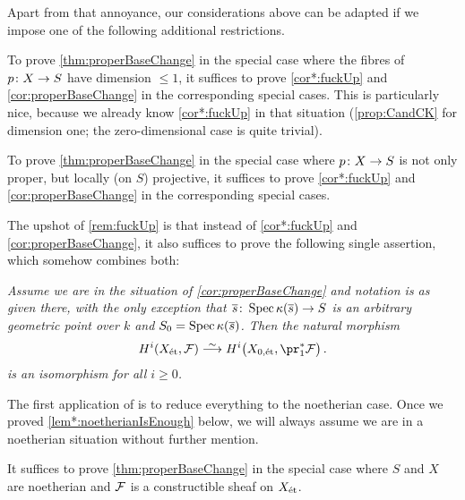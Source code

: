 \documentclass[a4paper, 10pt, oneside, DIV=9, chapterprefix=true, numbers=enddot, bibliography=totoc]{scrbook}
\begin{document}
\begin{rem}
Apart from that annoyance, our considerations above can be adapted if we impose one of the following additional restrictions.
\begin{numerate}
	\item To prove \cref{thm:properBaseChange} in the special case where the fibres of $p\colon X\morphism S$ have dimension $\leq 1$, it suffices to prove \cref{cor*:fuckUp} and \cref{cor:properBaseChange} in the corresponding special cases. This is particularly nice, because we already know \cref{cor*:fuckUp} in that situation (\cref{prop:CandCK} for dimension one; the zero-dimensional case is quite trivial).
	\item To prove \cref{thm:properBaseChange} in the special case where $p\colon X\morphism S$ is not only proper, but locally (on $S$) projective, it suffices to prove \cref{cor*:fuckUp} and \cref{cor:properBaseChange} in the corresponding special cases.
\end{numerate}
\end{rem}
\begin{rem*}\label{rem:fuckUp2}
	The upshot of \cref{rem:fuckUp} is that instead of \cref{cor*:fuckUp} and \cref{cor:properBaseChange}, it also suffices to prove the following single assertion, which somehow combines both:
	\begin{alphanumerate}
		\item[\itememph{\boxtimes}] \itshape Assume we are in the situation of \cref{cor:properBaseChange} and notation is as given there,  with the only exception that $\ov{s}\colon \Spec \kappa(\ov{s})\morphism S$ is an arbitrary geometric point over $k$ and $S_0=\Spec \kappa(\ov{s})$. Then the natural morphism
		\begin{equation*}
		H^i(X_\et,\Ff)\isomorphism H^i\big(X_{0,\et},\pr_1^*\Ff\big)\,.
		\end{equation*}
		is an isomorphism for all $i\geq 0$.\upshape
	\end{alphanumerate}
\end{rem*}
The first application of \itememph{\boxtimes} is to reduce everything to the noetherian case. Once we proved \cref{lem*:noetherianIsEnough} below, we will always assume we are in a noetherian situation without further mention.
\begin{lem*}\label{lem*:noetherianIsEnough}
	It suffices to prove \cref{thm:properBaseChange} in the special case where $S$ and $X$ are noetherian and $\mathcal{F}$ is a constructible sheaf on $X_{\mathrm{\acute{e}t}}$.
\end{lem*}
\end{document}
